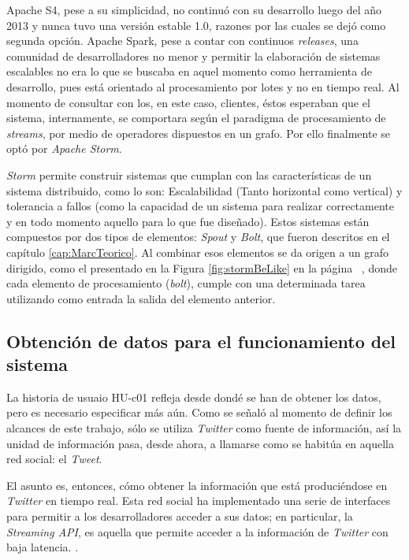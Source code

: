 Apache S4, pese a su simplicidad, no continuó con su desarrollo luego del año 2013 y nunca tuvo una versión estable 1.0, razones por las cuales se dejó como segunda opción. Apache Spark, pese a contar con continuos \textit{releases}, una comunidad de desarrolladores no menor y permitir la elaboración de sistemas escalables no era lo que se buscaba en aquel momento como herramienta de desarrollo, pues está orientado al procesamiento por lotes y no en tiempo real. Al momento de consultar con los, en este caso, clientes, éstos esperaban que el sistema, internamente, se comportara según el paradigma de procesamiento de \textit{streams}, por medio de operadores dispuestos en un grafo. Por ello finalmente se optó por \textit{Apache Storm}.

\textit{Storm} permite construir sistemas que cumplan con las características de un sistema distribuido, como lo son: Escalabilidad (Tanto horizontal como vertical) y tolerancia a fallos (como la capacidad de un sistema para realizar correctamente y en todo momento aquello para lo que fue diseñado). Estos sistemas están compuestos por dos tipos de elementos: \textit{Spout} y \textit{Bolt}, que fueron descritos en el capítulo \ref{cap:MarcTeorico}. Al combinar esos elementos se da origen a un grafo dirigido, como el presentado en la Figura \ref{fig:stormBeLike} en la página ~\pageref{fig:stormBeLike}, donde cada elemento de procesamiento (\textit{bolt}), cumple con una determinada tarea utilizando como entrada la salida del elemento anterior.

\subsection{Obtención de datos para el funcionamiento del sistema}
\label{sec:diseno:obtenerDatos}

La historia de usuaio HU-c01 refleja desde dondé se han de obtener los datos, pero es necesario especificar más aún. Como se señaló al momento de definir los alcances de este trabajo, sólo se utiliza \textit{Twitter} como fuente de información, así la unidad de información pasa, desde ahora, a llamarse como se habitúa en aquella red social: el \textit{Tweet}.

El asunto es, entonces, cómo obtener la información que está produciéndose en \textit{Twitter} en tiempo real. Esta red social ha implementado una serie de interfaces para permitir a los desarrolladores acceder a sus datos; en particular, la \textit{Streaming API}, es aquella que permite acceder a la información de \textit{Twitter} con baja latencia. \cite{TwitterStreamingAPI}.

